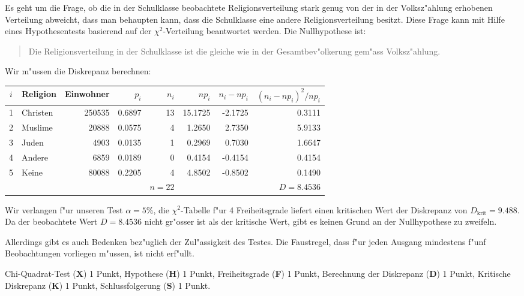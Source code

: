 \begin{loesung}
Es geht um die Frage, ob die in der Schulklasse beobachtete Religionsverteilung
stark genug von der in der Volksz"ahlung erhobenen Verteilung abweicht,
dass man behaupten kann, dass die Schulklasse eine andere Religionsverteilung
besitzt.
Diese Frage kann mit Hilfe eines Hypothesentests basierend auf der
$\chi^2$-Verteilung beantwortet werden. Die Nullhypothese ist:
\begin{quotation}
\parindent 0pt
Die Religionsverteilung in der Schulklasse ist die gleiche wie in
der Gesamtbev"olkerung gem"ass Volksz"ahlung.
\end{quotation}
Wir m"ussen die Diskrepanz berechnen:
\begin{center}
\begin{tabular}{|c|l|r|r|r|r|r|r|}
\hline
$i$&Religion&Einwohner&$p_i$    &$n_i$&$np_i$    &$n_i-np_i$&$(n_i-np_i)^2/np_i$\\
\hline
1  &Christen&   250535&0.6897   &   13&15.1725   &-2.1725   &0.3111\\
2  & Muslime&    20888&0.0575   &    4& 1.2650   & 2.7350   &5.9133\\
3  &   Juden&     4903&0.0135   &    1& 0.2969   & 0.7030   &1.6647\\
4  &  Andere&     6859&0.0189   &    0& 0.4154   &-0.4154   &0.4154\\
5  &   Keine&    80088&0.2205   &    4& 4.8502   &-0.8502   &0.1490\\
\hline
   &        &         &         &$n=22$&         &          &$D=8.4536$\\
\hline
\end{tabular}
\end{center}
Wir verlangen f"ur unseren Test $\alpha=5\%$, die $\chi^2$-Tabelle
f"ur 4 Freiheitsgrade liefert einen kritischen Wert der Diskrepanz
von $D_{\text{krit}}=9.488$. Da der beobachtete Wert $D=8.4536$
nicht gr"osser ist als der kritische Wert, gibt es keinen Grund an
der Nullhypothese zu zweifeln.

Allerdings gibt es auch Bedenken bez"uglich der Zul"assigkeit des
Testes.
Die Faustregel, dass f"ur jeden Ausgang mindestens
f"unf Beobachtungen vorliegen m"ussen, ist nicht erf"ullt.
\end{loesung}

\begin{bewertung}
Chi-Quadrat-Test ({\bf X}) 1 Punkt,
Hypothese ({\bf H}) 1 Punkt,
Freiheitsgrade ({\bf F}) 1 Punkt,
Berechnung der Diskrepanz ({\bf D}) 1 Punkt,
Kritische Diskrepanz ({\bf K}) 1 Punkt,
Schlussfolgerung ({\bf S}) 1 Punkt.
\end{bewertung}
